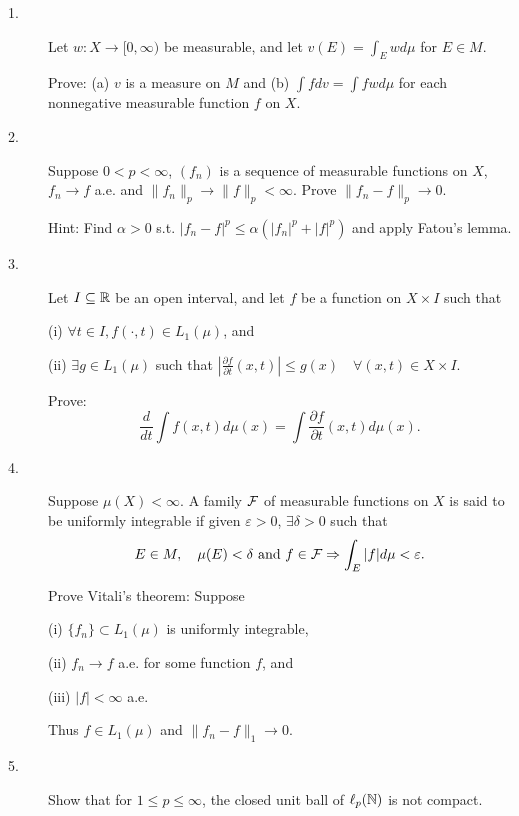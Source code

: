 \documentclass{article}
\begin{document}
\begin{description}

\item[1.]
Let $w: X \to [0,\infty)$ be measurable, and let $v(E) = \int_E wd \mu$
for $E \in M$.

Prove: (a) $v$ is a measure on $M$ and (b) $\int fdv = \int fwd \mu$ for
each nonnegative measurable function $f$ on $X$.

\item[2.]
Suppose $0<p< \infty$, $(f_n)$ is a sequence of measurable functions on $X$,
$f_n \to f$ a.e. and
$\parallel f_n \parallel_p \to \parallel f \parallel_p < \infty$. Prove
$\parallel f_n - f \parallel_p \to 0.$

Hint: Find $\alpha >0$ s.t. $|f_n - f|^p \leq \alpha (|f_n|^p + |f|^p)$
and apply Fatou's lemma.

\item[3.]
Let $I \subseteq \Bbb R$ be an open interval, and let $f$ be a function on
$X \times I$ such that

\item[\quad] (i)
$\forall t \in I, f (\cdot, t) \in L_1 (\mu)$, and

\item[\quad] (ii)
$\exists g \in L_1 (\mu)$ such that
$\left|\frac{\partial f}{\partial t} (x,t) \right| \leq g(x) \quad \forall
 (x,t) \in X \times I$.

Prove:
$$\frac{d}{dt} \int f(x,t) d \mu (x) = \int \frac{\partial f}{\partial t}
   (x,t) d \mu (x).$$

\item[4.]
Suppose $\mu (X) < \infty$. A family ${\cal F}$ of measurable functions on $X$
is said to be uniformly integrable if given $\varepsilon >0$,
$\exists \delta >0$ such that
$$E \in M, \quad \mu (E) < \delta \hbox{\ and\ }
  f \in {\cal F} \Rightarrow \int_E |f| d \mu < \varepsilon.$$

Prove Vitali's theorem: Suppose
\item[\quad] (i)
$\{f_n\} \subset L_1 (\mu)$ is uniformly integrable,

\item[\quad] (ii)
$f_n \to f$ a.e. for some function $f$, and

\item[\quad] (iii)
$|f| < \infty$ a.e.

Thus $f \in L_1 (\mu)$ and $\parallel f_n - f \parallel_1 \to 0$.

\item[5.]
Show that for $1 \leq p \leq \infty$, the closed unit ball of $\ell_p (\Bbb N)$
is not compact.


\end{description}
\end{document}
